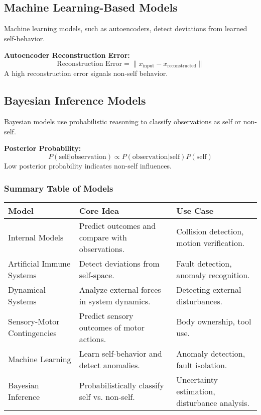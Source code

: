 \subsection{Machine Learning-Based Models}
Machine learning models, such as autoencoders, detect deviations from learned self-behavior.

\textbf{Autoencoder Reconstruction Error:}
\begin{equation}
\text{Reconstruction Error} = \| x_{\text{input}} - x_{\text{reconstructed}} \|
\end{equation}
A high reconstruction error signals non-self behavior.

\subsection{Bayesian Inference Models}
Bayesian models use probabilistic reasoning to classify observations as self or non-self.

\textbf{Posterior Probability:}
\begin{equation}
P(\text{self} | \text{observation}) \propto P(\text{observation} | \text{self}) P(\text{self})
\end{equation}
Low posterior probability indicates non-self influences.

\subsubsection{Summary Table of Models}

\begin{tabular}{|l|p{6cm}|p{5cm}|}
\hline
\textbf{Model} & \textbf{Core Idea} & \textbf{Use Case} \\ \hline
Internal Models & Predict outcomes and compare with observations. & Collision detection, motion verification. \\ \hline
Artificial Immune Systems & Detect deviations from self-space. & Fault detection, anomaly recognition. \\ \hline
Dynamical Systems & Analyze external forces in system dynamics. & Detecting external disturbances. \\ \hline
Sensory-Motor Contingencies & Predict sensory outcomes of motor actions. & Body ownership, tool use. \\ \hline
Machine Learning & Learn self-behavior and detect anomalies. & Anomaly detection, fault isolation. \\ \hline
Bayesian Inference & Probabilistically classify self vs. non-self. & Uncertainty estimation, disturbance analysis. \\ \hline
\end{tabular}

